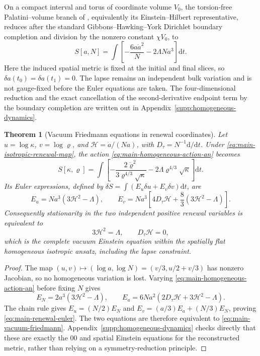 \documentclass[11pt]{article}
\newtheorem{theorem}{Theorem}[section]
\theoremstyle{definition}
\theoremstyle{remark}
\newcommand{\dd}{\mathrm d}
\begin{document}
On a compact interval and torus of coordinate volume $V_0$, the torsion-free
Palatini--volume branch of , equivalently its
Einstein--Hilbert representative, reduces after the standard
Gibbons--Hawking--York Dirichlet boundary completion
\cite{York1972,GibbonsHawking1977} and division by the nonzero constant
$\chi V_0$, to
\begin{equation}
 S[a,N]=\int\left[-\frac{6a\dot a^2}{N}-2\Lambda Na^3\right]\dd t.
 \label{eq:main-homogeneous-action-an}
\end{equation}
Here the induced spatial metric is fixed at the initial and final slices, so
$\delta a(t_0)=\delta a(t_1)=0$.  The lapse remains an independent bulk
variation and is not gauge-fixed before the Euler equations are taken.  The
four-dimensional reduction and the exact cancellation of the second-derivative
endpoint term by the boundary completion are written out in
Appendix~\ref{supp:homogeneous-dynamics}.

\begin{theorem}[Vacuum Friedmann equations in renewal coordinates]
\label{thm:main-homogeneous-friedmann}
Let $u=\log\kappa$, $v=\log\varrho$, and
$\mathcal H=\dot a/(Na)$, with $D_\tau=N^{-1}\dd/\dd t$.  Under
\eqref{eq:main-isotropic-renewal-map}, the action
\eqref{eq:main-homogeneous-action-an} becomes
\begin{equation}
 \boxed{
 S[\kappa,\varrho]
 =\int\left[-\frac{2\dot\varrho^2}
 {3\varrho^{4/3}\sqrt\kappa}
 -2\Lambda\varrho^{4/3}\sqrt\kappa\right]\dd t.}
 \label{eq:main-renewal-rate-action}
\end{equation}
Its Euler expressions, defined by
$\delta S=\int(E_u\delta u+E_v\delta v)\dd t$, are
\begin{equation}
 \boxed{
 E_u=Na^3(3\mathcal H^2-\Lambda),\qquad
 E_v=Na^3\left[4D_\tau\mathcal H+
 \frac83(3\mathcal H^2-\Lambda)\right].}
 \label{eq:main-renewal-euler}
\end{equation}
Consequently stationarity in the two independent positive renewal variables is
equivalent to
\begin{equation}
 \boxed{3\mathcal H^2=\Lambda,\qquad D_\tau\mathcal H=0,}
 \label{eq:main-vacuum-friedmann}
\end{equation}
which is the complete vacuum Einstein equation within the spatially flat
homogeneous isotropic ansatz, including the lapse constraint.
\end{theorem}

\begin{proof}
The map $(u,v)\mapsto(\log a,\log N)=(v/3,u/2+v/3)$ has nonzero
Jacobian, so no homogeneous variation is lost.  Varying
\eqref{eq:main-homogeneous-action-an} before fixing $N$ gives
\[
 E_N=2a^3(3\mathcal H^2-\Lambda),\qquad
 E_a=6Na^2(2D_\tau\mathcal H+3\mathcal H^2-\Lambda).
\]
The chain rule gives $E_u=(N/2)E_N$ and
$E_v=(a/3)E_a+(N/3)E_N$, proving
\eqref{eq:main-renewal-euler}.  The two equations are therefore equivalent to
\eqref{eq:main-vacuum-friedmann}.  Appendix~\ref{supp:homogeneous-dynamics}
checks directly that these are exactly the $00$ and spatial Einstein equations
for the reconstructed metric, rather than relying on a symmetry-reduction
principle.
\end{proof}
\end{document}
